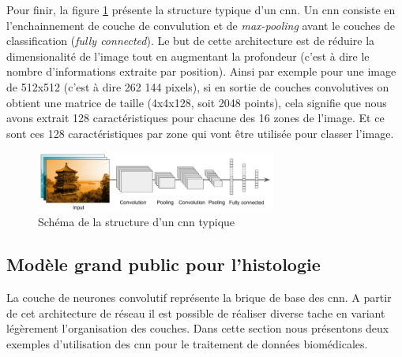 Pour finir, la figure \ref{fig:cnn_archi} présente la structure typique d'un \gls{cnn}. Un \gls{cnn} consiste en l'enchainnement de couche de convulution et de \textit{max-pooling} avant le couches de classification (\textit{fully connected}). Le but de cette architecture est de réduire la dimensionalité de l'image tout en augmentant la profondeur (c'est à dire le nombre d'informations extraite par position). Ainsi par exemple pour une image de 512x512 (c'est à dire 262 144 pixels), si en sortie de couches convolutives on obtient une matrice de taille (4x4x128, soit 2048 points), cela signifie que nous avons extrait 128 caractéristiques pour chacune des 16 zones de l'image. Et ce sont ces 128 caractéristiques par zone qui vont être utilisée pour classer l'image.
\begin{figure}[!htbp]
 \centering
 \includegraphics[width=0.7\textwidth]{figures/cnn_simple.png}
 \caption[Schéma de la structure d'un \gls{cnn} typique]{Schéma de la structure d'un \gls{cnn} typique}
 \label{fig:cnn_archi}
\end{figure}
\subsection{Modèle grand public pour l'histologie}
La couche de neurones convolutif représente la brique de base des \gls{cnn}. A partir de cet architecture de réseau il est possible de réaliser diverse tache en variant légèrement l'organisation des couches. Dans cette section nous présentons deux exemples d'utilisation des \gls{cnn} pour le traitement de données biomédicales.

